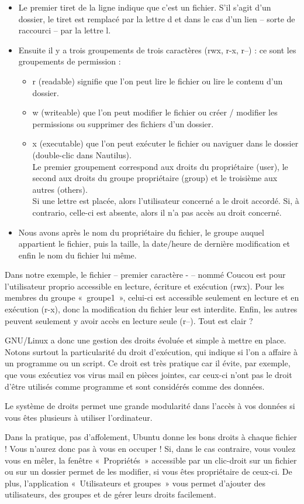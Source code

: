 \begin{itemize}
\item Le premier tiret de la ligne indique que c'est un fichier. S'il s'agit d'un dossier, le tiret est remplacé par la lettre d et dans le cas d'un lien -- sorte de raccourci -- par la lettre l.
\item Ensuite il y a trois groupements de trois caractères (rwx, r-x, r--) : ce sont les groupements de permission :
\begin{itemize}
\item r (readable) signifie que l'on peut lire le fichier ou lire le contenu d'un dossier.
\item w (writeable) que l'on peut modifier le fichier ou créer / modifier les permissions ou supprimer des fichiers d'un dossier.
\item x (executable) que l'on peut exécuter le fichier ou naviguer dans le dossier (double-clic dans Nautilus).\\
Le premier groupement correspond aux droits du propriétaire (user), le second aux droits du groupe propriétaire (group) et le troisième aux autres (others).\\
Si une lettre est placée, alors l'utilisateur concerné a le droit accordé. Si, à contrario, celle-ci est absente, alors il n'a pas accès au droit concerné.
\end{itemize}
\item Nous avons après le nom du propriétaire du fichier, le groupe auquel appartient le fichier, puis la taille, la date/heure de dernière modification et enfin le nom du fichier lui même. 
\end{itemize}
Dans notre exemple, le fichier -- premier caractère - -- nommé Coucou est pour l'utilisateur proprio accessible en lecture, écriture et exécution (rwx). Pour les membres du groupe «~groupe1~», celui-ci est accessible seulement en lecture et en exécution (r-x), donc la modification du fichier leur est interdite. Enfin, les autres peuvent seulement y avoir accès en lecture seule (r--). Tout est clair ?\par
GNU/Linux a donc une gestion des droits évoluée et simple à mettre en place. Notons surtout la particularité du droit d'exécution, qui indique si l'on a affaire à un programme ou un script. Ce droit est très pratique car il évite, par exemple, que vous exécutiez vos virus mail en pièces jointes, car ceux-ci n'ont pas le droit d'être utilisés comme programme et sont considérés comme des données.\par
Le système de droits permet une grande modularité dans l'accès à vos données si vous êtes plusieurs à utiliser l'ordinateur.
\begin{nota}
Dans la pratique, pas d'affolement, Ubuntu donne les bons droits à chaque fichier ! Vous n'aurez donc pas à vous en occuper ! Si, dans le cas contraire, vous voulez vous en mêler, la fenêtre «~Propriétés~» accessible par un clic-droit sur un fichier ou sur un dossier permet de les modifier, si vous êtes propriétaire de ceux-ci. De plus, l'application «~Utilisateurs et groupes~» vous permet d'ajouter des utilisateurs, des groupes et de gérer leurs droits facilement. 
\end{nota}
